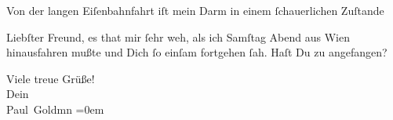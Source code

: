 \pstart
           Von der langen Eiſenbahnfahrt iſt mein Darm in einem{ }ſchauerlichen Zuſtande{\dotsseven}\pend
           
\pstart
           Liebſter Freund, es that mir{ }ſehr weh, als ich Samſtag{ }Abend aus Wien hinausfahren mußte und
               Dich{ }ſo einſam fortgehen{ }ſah. Haſt Du zu \label{K_L02891-3v}\label{K_L02891-3} angefangen?\pend
           
\pstart
           Viele treue Grüße! {\\[\baselineskip]}Dein {\\[\baselineskip]}\spacefill\mbox{Paul Goldmn}\pend
           \leftskip=0em{}\endnumbering{}  \newcommand{\dateiname}{L02891}\newcommand{\titel}{Paul Goldmann an Arthur Schnitzler, 23. 10. [1899]}\newcommand{\editorInnen}{Martin Anton Müller und Laura Untner}
